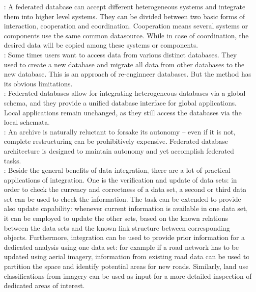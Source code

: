 \documentclass[12pt,a4paper]{report}
\begin{document}
	\citep{Jian}: A federated database can accept different heterogeneous systems and integrate them into higher level systems. They can be divided between two basic forms of interaction, cooperation and coordination. Cooperation means several systems or components use the same common datasource. While in case of coordination, the desired data will be copied among these systems or components.
	\\

	\citep{Jian}: Some times users want to access data from various distinct databases. They used to create a new database and migrate all data from other databases to the new database. This is an approach of re-enginneer databases. But the method has its obvious limitations.
	\\

	\citep{Butenuth}: Federated databases allow for integrating heterogeneous databases via a global schema, and they provide a unified database interface for global applications. Local applications remain unchanged, as they still access the databases via the local schemata.
	\\

	\citep{Malik}: An archive is naturally reluctant to forsake its autonomy – even if it is not, complete restructuring can be prohibitively expensive. Federated database architecture is designed to maintain autonomy and yet accomplish federated tasks.
	\\

	\citep{Butenuth}: Beside the general benefits of data integration, there are a lot of practical applications of integration. One is the verification and update of data sets: in order to check the currency and correctness of a data set, a second or third data set can be used to check the information. The task can be extended to provide also update capability: whenever current information is available in one data set, it can be employed to update the other sets, based on the known relations between the data sets and the known link structure between corresponding objects. Furthermore, integration can be used to provide prior information for a dedicated analysis using one data set: for example if a road network has to be updated using aerial imagery, information from existing road data can be used to partition the space and identify potential areas for new roads. Similarly, land use classifications from imagery can be used as input for a more detailed inspection of dedicated areas of interest. 
	\\




	\renewcommand{\bibname}{References}
	
	
\end{document}
